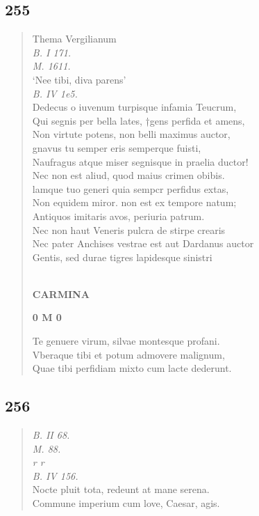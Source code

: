 \documentclass[11pt, a4paper]{report}
\begin{document}
            \subsection*{255}
      \begin{verse}
      Thema Vergilianum \\ \textit{B. I 171.} \\ \textit{M. 1611.} \\ ‘Nee tibi, diva parens’ \\ \textit{B. IV 1e5.} \\ Dedecus o iuvenum turpisque infamia Teucrum, \\ Qui segnis per bella lates, †gens perfida et amens, \\ Non virtute potens, non belli maximus auctor, \\ gnavus tu semper eris semperque fuisti, \\ Naufragus atque miser segnisque in praelia ductor! \\ Nec non est aliud, quod maius crimen obibis. \\ lamque tuo generi quia sempcr perfidus extas, \\ Non equidem miror. non est ex tempore natum; \\ Antiquos imitaris avos, periuria patrum. \\ Nec non haut Veneris pulcra de stirpe crearis \\ Nec pater Anchises vestrae  \lbrack est \rbrack  aut Dardanus auctor \\ Gentis, sed durae tigres lapidesque sinistri \\ 
        ﻿\pagebreak 
    \begin{center} \textbf{CARMINA} \end{center}\begin{center} \textbf{0 M 0} \end{center}Te genuere virum, silvae montesque profani. \\ Vberaque tibi et potum admovere malignum, \\ Quae tibi perfidiam mixto cum lacte dederunt. \\ 
      \end{verse}
  
            \subsection*{256}
      \begin{verse}
      \textit{B. II 68.} \\ \textit{M. 88.} \\ \textit{r r} \\ \textit{B. IV 156.} \\ Nocte pluit tota, redeunt at mane serena. \\ Commune imperium cum love, Caesar, agis. \\ 
      \end{verse}
  
\end{document}
